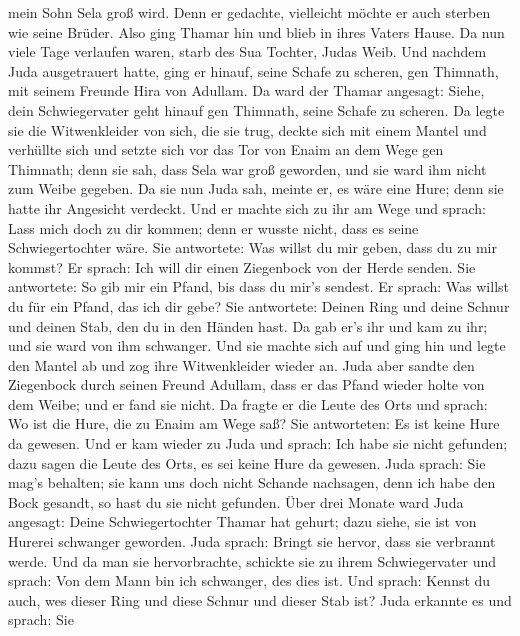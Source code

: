 mein Sohn Sela groß wird. Denn er gedachte, vielleicht möchte er auch
sterben wie seine Brüder. Also ging Thamar hin und blieb in ihres Vaters
Hause.  Da nun viele Tage verlaufen waren, starb des Sua
Tochter, Judas Weib. Und nachdem Juda ausgetrauert hatte, ging er
hinauf, seine Schafe zu scheren, gen Thimnath, mit seinem Freunde Hira
von Adullam.  Da ward der Thamar angesagt: Siehe, dein
Schwiegervater geht hinauf gen Thimnath, seine Schafe zu scheren.
 Da legte sie die Witwenkleider von sich, die sie trug,
deckte sich mit einem Mantel und verhüllte sich und setzte sich vor das
Tor von Enaim an dem Wege gen Thimnath; denn sie sah, dass Sela war groß
geworden, und sie ward ihm nicht zum Weibe gegeben.  Da
sie nun Juda sah, meinte er, es wäre eine Hure; denn sie hatte ihr
Angesicht verdeckt.  Und er machte sich zu ihr am Wege
und sprach: Lass mich doch zu dir kommen; denn er wusste nicht, dass es
seine Schwiegertochter wäre. Sie antwortete: Was willst du mir geben,
dass du zu mir kommst?  Er sprach: Ich will dir einen
Ziegenbock von der Herde senden. Sie antwortete: So gib mir ein Pfand,
bis dass du mir's sendest.  Er sprach: Was willst du für
ein Pfand, das ich dir gebe? Sie antwortete: Deinen Ring und deine
Schnur und deinen Stab, den du in den Händen hast. Da gab er's ihr und
kam zu ihr; und sie ward von ihm schwanger.  Und sie
machte sich auf und ging hin und legte den Mantel ab und zog ihre
Witwenkleider wieder an.  Juda aber sandte den Ziegenbock
durch seinen Freund Adullam, dass er das Pfand wieder holte von dem
Weibe; und er fand sie nicht.  Da fragte er die Leute des
Orts und sprach: Wo ist die Hure, die zu Enaim am Wege saß? Sie
antworteten: Es ist keine Hure da gewesen.  Und er kam
wieder zu Juda und sprach: Ich habe sie nicht gefunden; dazu sagen die
Leute des Orts, es sei keine Hure da gewesen.  Juda
sprach: Sie mag's behalten; sie kann uns doch nicht Schande nachsagen,
denn ich habe den Bock gesandt, so hast du sie nicht gefunden.
 Über drei Monate ward Juda angesagt: Deine
Schwiegertochter Thamar hat gehurt; dazu siehe, sie ist von Hurerei
schwanger geworden. Juda sprach: Bringt sie hervor, dass sie verbrannt
werde.  Und da man sie hervorbrachte, schickte sie zu
ihrem Schwiegervater und sprach: Von dem Mann bin ich schwanger, des
dies ist. Und sprach: Kennst du auch, wes dieser Ring und diese Schnur
und dieser Stab ist?  Juda erkannte es und sprach: Sie
